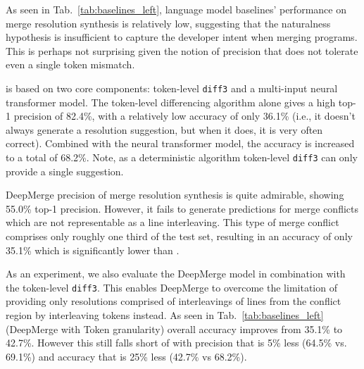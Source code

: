 As seen in Tab.~\ref{tab:baselines_left}, language model baselines' performance on merge resolution synthesis is relatively low, suggesting that the naturalness hypothesis is insufficient to capture the developer intent when merging programs. This is perhaps not surprising given the notion of precision that does not tolerate even a single token mismatch. 

\thistool{} is based on two core components: token-level \texttt{diff3} and a multi-input neural transformer model. The token-level differencing algorithm alone gives a high top-1 precision of 82.4\%, with a relatively low accuracy of only 36.1\% (i.e., it doesn't always generate a resolution suggestion, but when it does, it is very often correct). Combined with the neural transformer model, the accuracy is increased to a total of 68.2\%. Note, as a deterministic algorithm token-level \texttt{diff3} can only provide a single suggestion. 

DeepMerge precision of merge resolution synthesis is quite admirable, showing 55.0\% top-1 precision. However, it fails to generate predictions for merge conflicts which are not representable as a line interleaving. This type of merge conflict comprises only roughly one third of the test set, resulting in an accuracy of only 35.1\% which is significantly lower than \thistool{}.


As an experiment, we also evaluate the DeepMerge model in combination with the token-level \texttt{diff3}. This enables DeepMerge to overcome the limitation of providing only resolutions comprised of interleavings of lines from the conflict region by interleaving tokens instead. As seen in Tab.~\ref{tab:baselines_left} (DeepMerge with Token granularity) overall accuracy improves from 35.1\% to 42.7\%. However this still falls short of \thistool{} with precision that is 5\% less (64.5\% vs. 69.1\%) and accuracy that is 25\% less (42.7\% vs 68.2\%). 



